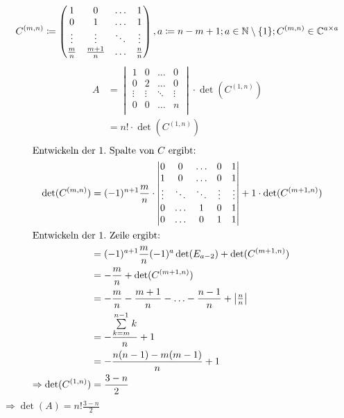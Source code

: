 \documentclass{HM}
\begin{document}
\begin{enumerate}
\begin{enumerate}
			$$C^{(m,n)}\coloneqq\begin{pmatrix}
				1&0&\hdots&1\\
				0&1&\hdots&1\\
				\vdots&\vdots&\ddots&\vdots\\
				\tfrac{m}{n}&\tfrac{m+1}{n}&\hdots&\tfrac{n}{n}
			\end{pmatrix}, a\coloneqq n-m+1; a\in\mathbb{N}\setminus\{1\}; C^{(m,n)}\in \mathbb{C}^{a\times a}$$
			\begin{align*}
				A&=\begin{vmatrix}
					1&0&\hdots&0\\
					0&2&\hdots&0\\
					\vdots&\vdots&\ddots&\vdots\\
					0&0&\hdots&n\\
				\end{vmatrix}\cdot \det(C^{(1,n)})\\
				&=n!\cdot \det(C^{(1,n)})
			\end{align*}	
			\begin{align*}
				\intertext{Entwickeln der $1.$ Spalte von $C$ ergibt:}
				\det(C^{(m,n)})&=(-1)^{n+1}\frac{m}{n}\cdot\begin{vmatrix}
					0&0&\hdots&0&1\\
					1&0&\hdots&0&1\\
					\vdots&\ddots&\ddots&\vdots&\vdots\\
					0&\hdots&1&0&1\\
					0&\hdots&0&1&1
				\end{vmatrix}+1\cdot \det(C^{(m+1,n)})\\
				\intertext{Entwickeln der $1.$ Zeile ergibt:}
				&=(-1)^{a+1}\frac{m}{n}(-1)^{a}\det(E_{a-2})+\det(C^{(m+1,n)})\\
				&=-\frac{m}{n}+\det(C^{(m+1,n)})\\
				&=-\frac{m}{n}-\frac{m+1}{n}-\hdots-\frac{n-1}{n}+\begin{vmatrix}
					\tfrac{n}{n}
				\end{vmatrix}\\
				&=-\frac{\sum\limits_{k=m}^{n-1}k}{n}+1\\
				&=-\frac{n(n-1)-m(m-1)}{n}+1\\
				\Rightarrow \det(C^{(1,n)}) &= \frac{3-n}{2}
			\end{align*}
			$\Rightarrow \det(A)=n!\frac{3-n}{2}$
			

\end{enumerate}
\end{enumerate}
\end{document}
